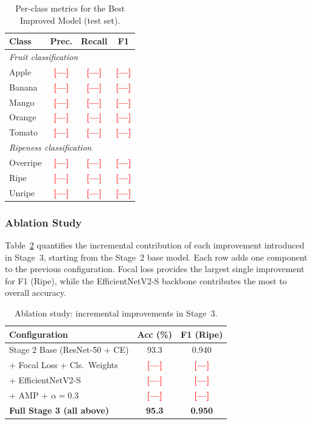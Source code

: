 \documentclass[10pt,twocolumn,letterpaper]{article}
\newcommand{\placeholder}[1]{\textcolor{red}{\textbf{[#1]}}}
\begin{document}
\begin{table}[H]
  \centering\small
  \caption{Per-class metrics for the Best Improved Model (test set).}
  \label{tab:perclass}
  \begin{tabular}{lccc}
    \toprule
    \textbf{Class} & \textbf{Prec.} & \textbf{Recall} & \textbf{F1} \\
    \midrule
    \multicolumn{4}{l}{\textit{Fruit classification}} \\
    \quad Apple   & \placeholder{—} & \placeholder{—} & \placeholder{—} \\
    \quad Banana  & \placeholder{—} & \placeholder{—} & \placeholder{—} \\
    \quad Mango   & \placeholder{—} & \placeholder{—} & \placeholder{—} \\
    \quad Orange  & \placeholder{—} & \placeholder{—} & \placeholder{—} \\
    \quad Tomato  & \placeholder{—} & \placeholder{—} & \placeholder{—} \\
    \midrule
    \multicolumn{4}{l}{\textit{Ripeness classification}} \\
    \quad Overripe & \placeholder{—} & \placeholder{—} & \placeholder{—} \\
    \quad Ripe     & \placeholder{—} & \placeholder{—} & \placeholder{—} \\
    \quad Unripe   & \placeholder{—} & \placeholder{—} & \placeholder{—} \\
    \bottomrule
  \end{tabular}
\end{table}

\subsubsection{Ablation Study}

Table~\ref{tab:ablation} quantifies the incremental contribution of each improvement introduced in Stage~3, starting from the Stage~2 base model.
Each row adds one component to the previous configuration.
Focal loss provides the largest single improvement for F1 (Ripe), while the EfficientNetV2-S backbone contributes the most to overall accuracy.

\begin{table}[H]
  \centering\small
  \caption{Ablation study: incremental improvements in Stage~3.}
  \label{tab:ablation}
  \begin{tabular}{lcc}
    \toprule
    \textbf{Configuration} & \textbf{Acc (\%)} & \textbf{F1 (Ripe)} \\
    \midrule
    Stage 2 Base (ResNet-50 + CE)    & 93.3 & 0.940 \\
    \quad + Focal Loss + Cls.\ Weights & \placeholder{—} & \placeholder{—} \\
    \quad + EfficientNetV2-S          & \placeholder{—} & \placeholder{—} \\
    \quad + AMP + $\alpha{=}0.3$      & \placeholder{—} & \placeholder{—} \\
    \textbf{Full Stage 3 (all above)} & \textbf{95.3} & \textbf{0.950} \\
    \bottomrule
  \end{tabular}
\end{table}
\end{document}
